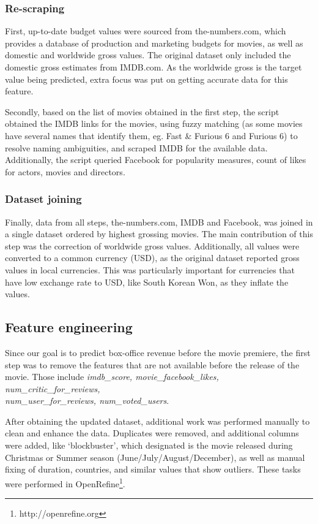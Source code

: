\subsubsection{Re-scraping}
First, up-to-date budget values were sourced from the-numbers.com, which provides a database of production and marketing budgets for movies, as well as domestic and worldwide gross values. The original dataset only included the domestic gross estimates from IMDB.com. As the worldwide gross is the target value  being predicted, extra focus was put on getting accurate data for this feature.

Secondly, based on the list of movies obtained in the first step, the script obtained the IMDB links for the movies, using fuzzy matching (as some movies have several names that identify them, eg. Fast \& Furious 6 and Furious 6) to resolve naming ambiguities, and scraped IMDB for the available data. Additionally, the script queried Facebook for popularity measures, count of likes for actors, movies and directors.

\subsubsection{Dataset joining}
Finally, data from all steps, the-numbers.com, IMDB and Facebook, was joined in a single dataset ordered by highest grossing movies. The main contribution of this step was the correction of worldwide gross values. Additionally, all values were converted to a common currency (USD), as the original dataset reported gross values in local currencies. This was particularly important for currencies that have low exchange rate to USD, like South Korean Won, as they inflate the values.

\subsection{Feature engineering}
Since our goal is to predict box-office revenue before the movie premiere, the first step was to remove the features that are not available before the release of the movie. Those include \textit{imdb\_score, movie\_facebook\_likes, num\_critic\_for\_reviews, \\num\_user\_for\_reviews, num\_voted\_users}.

After obtaining the updated dataset, additional work was performed manually to clean and enhance the data. Duplicates were removed, and additional columns were added, like ‘blockbuster’, which designated is the movie released during Christmas or Summer season (June/July/August/December), as well as manual fixing of duration, countries, and similar values that show outliers. These tasks were performed in OpenRefine\footnote{http://openrefine.org}.


